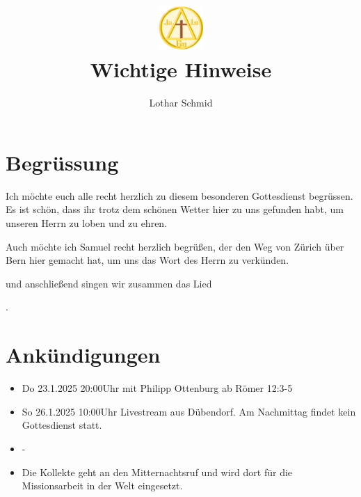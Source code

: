 \documentclass{../inc/mybib}
\title{\includegraphics[height=48pt]{assets/images/logo.png}\\Wichtige Hinweise}
\author{Lothar Schmid}
\begin{document}
\maketitle
\section{Begrüssung}

Ich möchte euch alle recht herzlich zu diesem besonderen Gottesdienst begrüssen. Es ist schön, dass ihr trotz dem schönen Wetter hier zu uns gefunden habt, um unseren Herrn zu loben und zu ehren.

Auch möchte ich Samuel recht herzlich begrüßen, der den Weg von Zürich über Bern hier gemacht hat, um uns das Wort des Herrn zu verkünden. 

\noindent
\beten{} und anschließend singen wir zusammen das Lied

\noindent
{}.

\section{Ankündigungen}
\begin{itemize}
    \item {} Do 23.1.2025 20:00Uhr mit Philipp Ottenburg ab Römer 12:3-5
    \item {} So 26.1.2025 10:00Uhr Livestream aus Dübendorf. Am Nachmittag findet kein Gottesdienst statt.
    \item {} -
    \item {} Die Kollekte geht an den Mitternachtsruf und wird dort für die Missionsarbeit in der Welt eingesetzt.
\end{itemize}
\end{document}
